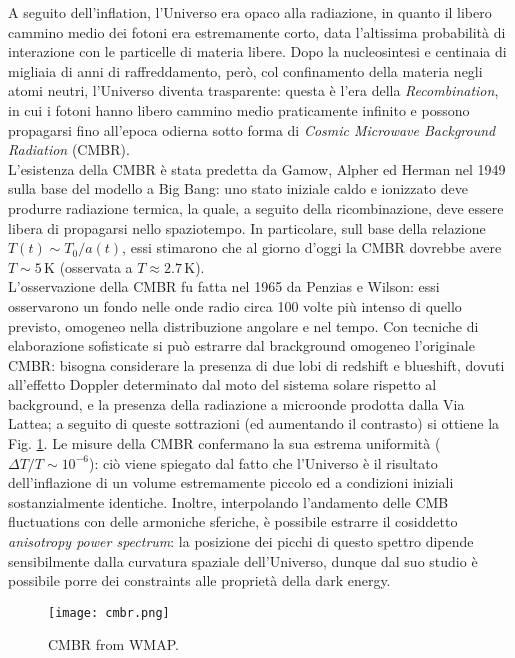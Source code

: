 A seguito dell'inflation, l'Universo era opaco alla radiazione, in quanto il libero cammino medio dei fotoni era estremamente corto, data l'altissima probabilità di interazione con le particelle di materia libere. Dopo la nucleosintesi e centinaia di migliaia di anni di raffreddamento, però, col confinamento della materia negli atomi neutri, l'Universo diventa trasparente: questa è l'era della \textit{Recombination}, in cui i fotoni hanno libero cammino medio praticamente infinito e possono propagarsi fino all'epoca odierna sotto forma di \textit{Cosmic Microwave Background Radiation} (CMBR).\\
L'esistenza della CMBR è stata predetta da Gamow, Alpher ed Herman nel 1949 sulla base del modello a Big Bang: uno stato iniziale caldo e ionizzato deve produrre radiazione termica, la quale, a seguito della ricombinazione, deve essere libera di propagarsi nello spaziotempo. In particolare, sull base della relazione $ T(t) \sim T_0 / a(t) $, essi stimarono che al giorno d'oggi la CMBR dovrebbe avere $ T \sim 5 \,\text{K} $ (osservata a $ T \approx 2.7 \,\text{K} $).\\
L'osservazione della CMBR fu fatta nel 1965 da Penzias e Wilson: essi osservarono un fondo nelle onde radio circa 100 volte più intenso di quello previsto, omogeneo nella distribuzione angolare e nel tempo. Con tecniche di elaborazione sofisticate si può estrarre dal brackground omogeneo l'originale CMBR: bisogna considerare la presenza di due lobi di redshift e blueshift, dovuti all'effetto Doppler determinato dal moto del sistema solare rispetto al background, e la presenza della radiazione a microonde prodotta dalla Via Lattea; a seguito di queste sottrazioni (ed aumentando il contrasto) si ottiene la Fig. \ref{cmbr}.
Le misure della CMBR confermano la sua estrema uniformità ($ \Delta T / T \sim 10^{-6} $): ciò viene spiegato dal fatto che l'Universo è il risultato dell'inflazione di un volume estremamente piccolo ed a condizioni iniziali sostanzialmente identiche. Inoltre, interpolando l'andamento delle CMB fluctuations con delle armoniche sferiche, è possibile estrarre il cosiddetto \textit{anisotropy power spectrum}: la posizione dei picchi di questo spettro dipende sensibilmente dalla curvatura spaziale dell'Universo, dunque dal suo studio è possibile porre dei constraints alle proprietà della dark energy.

\begin{figure}
	\centering
	\texttt{[image: cmbr.png]}
	\caption{CMBR from WMAP.}
	\label{cmbr}
\end{figure}










